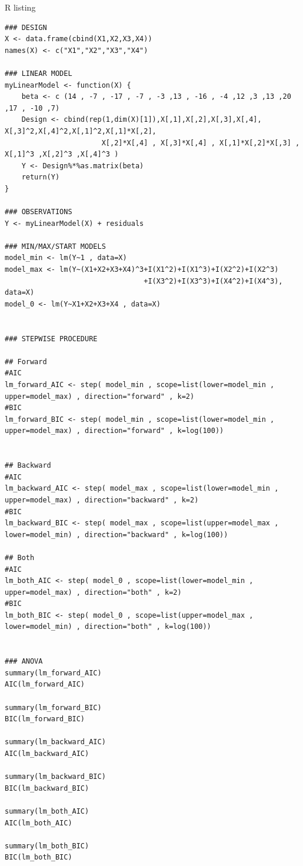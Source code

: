 R listing
\begin{lstlisting}[style=RStyle]
### DESIGN
X <- data.frame(cbind(X1,X2,X3,X4))
names(X) <- c("X1","X2","X3","X4")

### LINEAR MODEL
myLinearModel <- function(X) {
    beta <- c (14 , -7 , -17 , -7 , -3 ,13 , -16 , -4 ,12 ,3 ,13 ,20 ,17 , -10 ,7)
    Design <- cbind(rep(1,dim(X)[1]),X[,1],X[,2],X[,3],X[,4], X[,3]^2,X[,4]^2,X[,1]^2,X[,1]*X[,2],
                       X[,2]*X[,4] , X[,3]*X[,4] , X[,1]*X[,2]*X[,3] , X[,1]^3 ,X[,2]^3 ,X[,4]^3 )
    Y <- Design%*%as.matrix(beta)
    return(Y)
}

### OBSERVATIONS
Y <- myLinearModel(X) + residuals

### MIN/MAX/START MODELS
model_min <- lm(Y~1 , data=X)
model_max <- lm(Y~(X1+X2+X3+X4)^3+I(X1^2)+I(X1^3)+I(X2^2)+I(X2^3)
                                 +I(X3^2)+I(X3^3)+I(X4^2)+I(X4^3), data=X)
model_0 <- lm(Y~X1+X2+X3+X4 , data=X)


### STEPWISE PROCEDURE

## Forward
#AIC
lm_forward_AIC <- step( model_min , scope=list(lower=model_min , upper=model_max) , direction="forward" , k=2)
#BIC
lm_forward_BIC <- step( model_min , scope=list(lower=model_min , upper=model_max) , direction="forward" , k=log(100))


## Backward
#AIC
lm_backward_AIC <- step( model_max , scope=list(lower=model_min , upper=model_max) , direction="backward" , k=2)
#BIC
lm_backward_BIC <- step( model_max , scope=list(upper=model_max , lower=model_min) , direction="backward" , k=log(100))

## Both
#AIC
lm_both_AIC <- step( model_0 , scope=list(lower=model_min , upper=model_max) , direction="both" , k=2)
#BIC
lm_both_BIC <- step( model_0 , scope=list(upper=model_max , lower=model_min) , direction="both" , k=log(100))


### ANOVA
summary(lm_forward_AIC)
AIC(lm_forward_AIC)

summary(lm_forward_BIC)
BIC(lm_forward_BIC)

summary(lm_backward_AIC)
AIC(lm_backward_AIC)

summary(lm_backward_BIC)
BIC(lm_backward_BIC)

summary(lm_both_AIC)
AIC(lm_both_AIC)

summary(lm_both_BIC)
BIC(lm_both_BIC)
\end{lstlisting}

